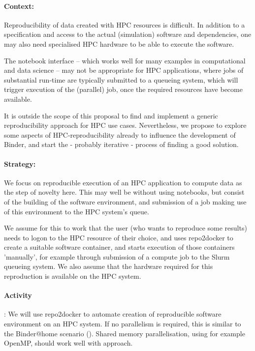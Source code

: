 \begin{task}[
  title=Binder at HPC facilities,
  id=binder-at-hpc,
  lead=SRL,
  PM=1,
  wphases={0-36},
  partners={XXX}
]
\paragraph*{Context:}
Reproducibility of data created with HPC resources is difficult. In addition to
a specification and access to the actual (simulation) software and dependencies,
one may also need specialised HPC hardware to be able to execute the software.

The notebook interface -- which works well for many examples in computational and
data science -- may not be appropriate for HPC applications, where jobs of
substantial run-time are typically submitted to a queueing system, which will
trigger execution of the (parallel) job, once the required resources have become
available.

It is outside the scope of this proposal to find and implement a generic
reproducibility approach for HPC use cases. Nevertheless, we propose to explore
some aspects of HPC-reproducibility already to influence the development of Binder,
and start the - probably iterative - process of finding a good solution. 

\paragraph*{Strategy:}
We focus on reproducible execution of an HPC application to compute data as the step of
novelty here. This may well be without using notebooks, but consist of the
building of the software environment, and submission of a job making use of this
environment to the HPC system's queue.

We assume for this to work that the user (who wants to reproduce some results)
needs to logon to the HPC resource of their choice, and uses repo2docker to
create a suitable software container, and starts execution of those containers
'manually', for example through submission of a compute job to the Slurm
queueing system. We also assume that the hardware required for this reproduction
is available on the HPC system.

\paragraph*{Activity}: We will use repo2docker to automate creation of
reproducible software environment on an HPC system. If no parallelism is
required, this is similar to the Binder@home scenario
(). Shared memory parallelisation, using for
example OpenMP, should work well with approach.


\end{task}
